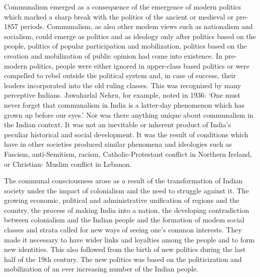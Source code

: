 \begin{multicols}{2}
Communalism emerged as a consequence of the emergence of modern politics which marked a sharp break with the politics of the ancient or medieval or pre-1857 periods. Communalism, as also other modem views such as nationalism and socialism, could emerge as politics and as ideology only after politics based on the people, politics of popular participation and mobilization, politics based on the creation and mobilization of public opinion had come into existence. In pre-modern politics, people were either ignored in upper-class based politics or were compelled to rebel outside the political system and, in case of success, their leaders incorporated into the old ruling classes. This was recognized by many perceptive Indians. Jawaharlal Nehru, for example, noted in 1936: `One must never forget that communalism in India is a latter-day phenomenon which has grown up before our eyes.' Nor was there anything unique about communalism in the Indian context. It was not an inevitable or inherent product of India's peculiar historical and social development. It was the result of conditions which have in other societies produced similar phenomena and ideologies such as Fascism, anti-Semitism, racism, Catholic-Protestant conflict in Northern Ireland, or Christian- Muslim conflict in Lebanon.

The communal consciousness arose as a result of the transformation of Indian society under the impact of colonialism and the need to struggle against it. The growing economic, political and administrative unification of regions and the country, the process of making India into a nation, the developing contradiction between colonialism and the Indian people and the formation of modem social classes and strata called for new ways of seeing one's common interests. They made it necessary to have wider links and loyalties among the people and to form new identities. This also followed from the birth of new politics during the last half of the 19th century. The new politics was based on the politicization and mobilization of an ever increasing number of the Indian people.


\end{multicols}
